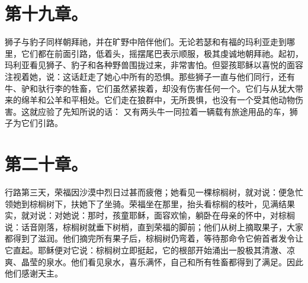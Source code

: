 
\section{第十九章。}

狮子与豹子同样朝拜祂，并在旷野中陪伴他们。无论若瑟和有福的玛利亚走到哪里，它们都在前面引路，低着头，摇摆尾巴表示顺服，极其虔诚地朝拜祂。起初，玛利亚看见狮子、豹子和各种野兽围拢过来，非常害怕。但婴孩耶稣以喜悦的面容注视着她，说：这话赶走了她心中所有的恐惧。那些狮子一直与他们同行，还有牛、驴和驮行李的牲畜，它们虽然紧挨着，却没有伤害任何一个。它们与从犹大带来的绵羊和公羊和平相处。它们走在狼群中，无所畏惧，也没有一个受其他动物伤害。这就应验了先知所说的话： 又有两头牛一同拉着一辆载有旅途用品的车，狮子为它们引路。\par


\section{第二十章。}

行路第三天，荣福因沙漠中烈日过甚而疲倦；她看见一棵棕榈树，就对说：便急忙领她到棕榈树下，扶她下了坐骑。荣福坐在那里，抬头看棕榈的枝叶，见满结果实，就对说：对她说：那时，孩童耶稣，面容欢愉，躺卧在母亲的怀中，对棕榈说：话音刚落，棕榈树就垂下树梢，直到荣福的脚前；他们从树上摘取果子，大家都得到了滋润。他们摘完所有果子后，棕榈树仍弯着，等待那命令它俯首者发令让它直起。耶稣便对它说：棕榈树立即挺起，它的根部开始涌出一股极其清澈、凉爽、晶莹的泉水。他们看见泉水，喜乐满怀，自己和所有牲畜都得到了满足。因此他们感谢天主。\par


